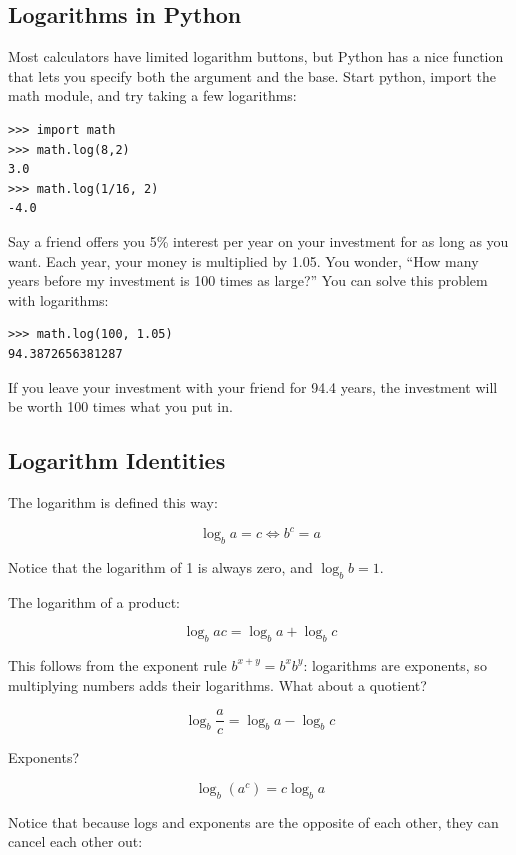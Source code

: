 \subsection{Logarithms in Python}

Most calculators have limited logarithm buttons, but
Python has a nice  function that lets you specify both
the argument and the base. Start python, import the math module, and try taking a few logarithms:

\begin{verbatim}
>>> import math
>>> math.log(8,2)
3.0
>>> math.log(1/16, 2)
-4.0
\end{verbatim}

Say a friend offers you 5\% interest per year on your investment for as
long as you want. Each year, your money is multiplied by 1.05. You wonder, ``How many years
before my investment is 100 times as large?'' You can solve this problem with logarithms:

\begin{verbatim}
>>> math.log(100, 1.05)
94.3872656381287
\end{verbatim}

If you leave your investment with your friend for 94.4 years, the
investment will be worth 100 times what you put in.

\subsection{Logarithm Identities}

The logarithm is defined this way:

$$\log_b a = c \iff b^c = a$$

Notice that the logarithm of 1 is always zero, and $\log_b b = 1$.

The logarithm of a product:

$$\log_b a c = \log_b a + \log_b c$$

This follows from the exponent rule $b^{x + y} = b^x b^y$: logarithms
are exponents, so multiplying numbers adds their logarithms. What about a quotient?

$$\log_b \frac{a}{c} = \log_b a - \log_b c$$

Exponents?

$$\log_b \left(a^c\right) = c \log_b a$$

Notice that because logs and exponents are the opposite of each other, they can cancel each other out:

